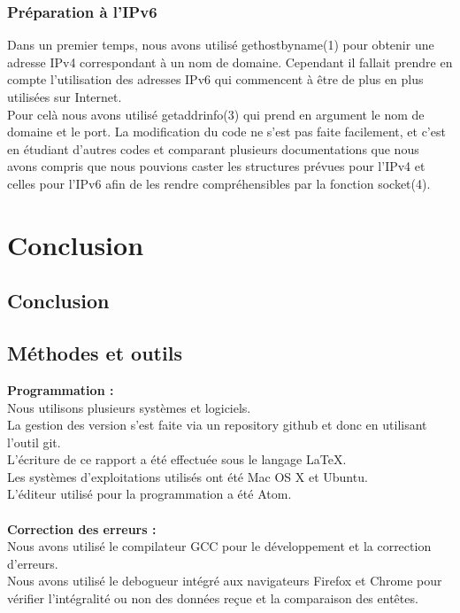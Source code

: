 \documentclass{scrreprt}
\begin{document}
\subsection{Préparation à l'IPv6}
Dans un premier temps, nous avons utilisé gethostbyname(1) pour obtenir une adresse IPv4 correspondant à un nom de domaine. Cependant il fallait prendre en compte l'utilisation des adresses IPv6 qui commencent à être de plus en plus utilisées sur Internet.\\
Pour celà nous avons utilisé getaddrinfo(3) qui prend en argument le nom de domaine et le port. La modification du code ne s'est pas faite facilement, et c'est en étudiant d'autres codes et comparant plusieurs documentations que nous avons compris que nous pouvions caster les structures prévues pour l'IPv4 et celles pour l'IPv6 afin de les rendre compréhensibles par la fonction socket(4).

\chapter{Conclusion}

\section{Conclusion}


\section{Méthodes et outils}
\textbf{Programmation :}\\
Nous utilisons plusieurs systèmes et logiciels.\\
La gestion des version s'est faite via un repository github et donc en utilisant l'outil git.\\
L'écriture de ce rapport a été effectuée sous le langage LaTeX.\\
Les systèmes d'exploitations utilisés ont été Mac OS X et Ubuntu.\\
L'éditeur utilisé pour la programmation a été Atom.\\\\
\textbf{Correction des erreurs :}\\
Nous avons utilisé le compilateur GCC pour le développement et la correction d'erreurs.\\
Nous avons utilisé le debogueur intégré aux navigateurs Firefox et Chrome pour vérifier l'intégralité ou non des données reçue et la comparaison des entêtes.
\end{document}
